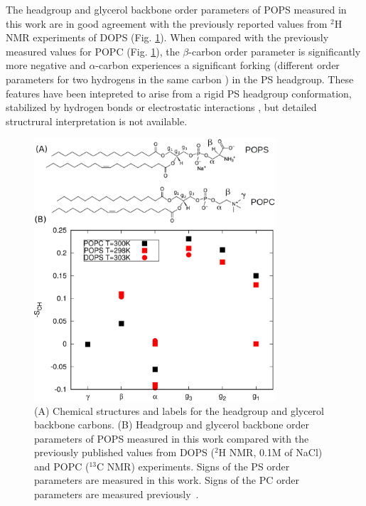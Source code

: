 \documentclass[aps,prl,superscriptaddress,twocolumn]{revtex4}
\begin{document}
The headgroup and glycerol backbone order parameters of 
POPS measured in this work are in good agreement with the previously reported
values from $^2$H NMR experiments of DOPS \cite{browning80} (Fig. \ref{HGorderParameters}).
When compared with the previously measured values for POPC \cite{ferreira13} (Fig. \ref{HGorderParameters}),
the $\beta$-carbon order parameter is significantly more negative and $\alpha$-carbon
experiences a significant forking (different order parameters for two hydrogens in the same carbon \cite{ollila16}) in the PS headgroup.
These features have been intepreted to arise from a rigid PS headgroup
conformation, stabilized by hydrogen bonds or electrostatic
interactions \cite{browning80,buldt81}, but detailed structrural interpretation is not
available. 
\begin{figure}[]
  \centering
  \includegraphics[width=9.0cm]{../Figs/PCPScomp.eps}
  \caption{\label{HGorderParameters}
    (A) Chemical structures and labels for the headgroup and glycerol backbone carbons.
    (B) Headgroup and glycerol backbone order parameters of POPS measured in this work compared
    with the previously published values from DOPS ($^2$H NMR, 0.1M of NaCl) \cite{browning80} and 
    POPC  ($^{13}$C NMR) \cite{ferreira13} experiments. Signs of the PS order parameters
    are measured in this work. Signs of the PC order parameters are measured previously~\cite{ferreira16}.
  }
\end{figure}
\end{document}
